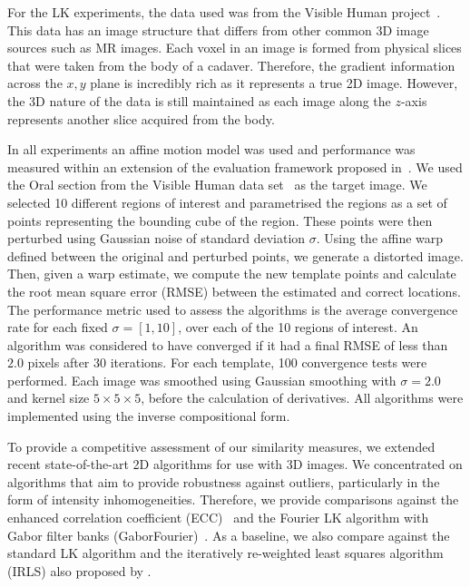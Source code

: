 For the LK experiments, the data used was from the Visible Human
project~\cite{spitzer1996visiblehuman}.
This data has an image structure that differs from
other common 3D image sources such as MR images. Each voxel in an image is
formed from physical slices that were taken from the body of a cadaver.
Therefore, the gradient information across the $x, y$ plane is incredibly rich
as it represents a true 2D image. However, the 3D nature of the data is still
maintained as each image along the $z$-axis represents another slice acquired
from the body.

In all experiments an affine motion model was used and performance was measured
within an extension of the evaluation framework proposed
in~\cite{tzimiropoulos2011robust}.
We used the Oral section from the Visible Human data
set~\cite{spitzer1996visiblehuman} as
the target image. We selected 10 different regions of interest and parametrised
the regions as a set of points representing the bounding cube of the region.
These points were then perturbed using Gaussian noise of standard deviation
$\sigma$. Using the affine warp defined between the original and perturbed
points, we generate a distorted image. Then, given a warp estimate, we compute
the new template points and calculate the root mean square error (RMSE) between
the estimated and correct locations. The performance metric used to assess the
algorithms is the average convergence rate for each fixed $\sigma = [1, 10]$,
over each of the 10 regions of interest. An algorithm was considered to have
converged if it had a final RMSE of less than $2.0$ pixels after 30 iterations.
For each template, 100 convergence tests were performed. Each image was smoothed
using Gaussian smoothing with $\sigma = 2.0$ and kernel size $5\times5\times5$,
before the calculation of derivatives. All algorithms were implemented using the
inverse compositional form.

To provide a competitive assessment of our similarity measures, we extended
recent state-of-the-art 2D algorithms for use with 3D images. We concentrated on
algorithms that aim to provide robustness against outliers, particularly in the
form of intensity inhomogeneities. Therefore, we provide comparisons against the
enhanced correlation coefficient (ECC)~\cite{evangelidis2008parametric}
and the Fourier LK
algorithm with Gabor filter banks (GaborFourier)~\cite{lucey2013fourier}. As a
baseline, we also compare against the standard LK algorithm and the iteratively
re-weighted least squares algorithm (IRLS) also proposed by
\citet{baker2005lk20yearsonpart5}.

